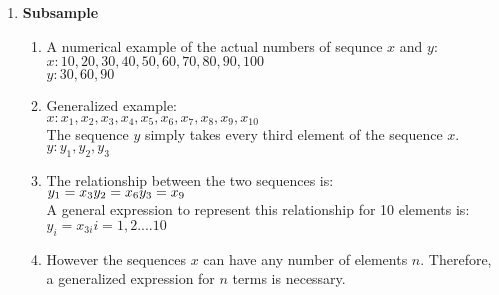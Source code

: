 \documentclass[letterpaper, 24pt, final, onecolumn, titlepage] {article}
\begin{document}
\begin {enumerate}
\begin{enumerate}
			\pagebreak
			\item However the sequences $x$ can have any number of elements $n$. Therefore, a generalized expression for $n$ terms is necessary.\\
				$x:x_0,x_1,x_2,x_3,...,x_{n-2},x_{n-1},x_n$\\
				$y:y_0,y_1,y_2,y_3,....,y_{n-2},y_{n-1},y_n$\\
				Each Element of $y$ can  be written i terms of $x$:\\
				$y_0=x_n\\
				 y_1=x_{n-1}\\
				 y_2=x_{n-2}\\
				 ...\\
			 	y_{n-2}=x_2\\
				 y_{n-1}=x_1\\
				 y_n=x_0$\\
 				 A general expression to represent this relationship for $n$ elements is:\\
				 $y_i=x_{n-i}$\hspace{10mm}$i=0,1,2,....n\\$
		\end{enumerate}
	\item \textbf{Subsample}
		\begin{enumerate}
			\item A numerical example of the actual numbers of sequnce $x$ and $y$:\\
				$x:10,20,30,40,50,60,70,80,90,100$\\
				$y:30,60,90$\\
			\item Generalized example:\\
				$x:x_1,x_2,x_3,x_4,x_5,x_6,x_7,x_8,x_9,x_{10}$\\
				The sequence $y$ simply takes every third element of the sequence $x$.\\
				$y:y_1,y_2,y_3$\\
			\item The relationship between the two sequences is:\\
				$y_1=x_3\\
				 y_2=x_6\\
				 y_3=x_9$\\
				 A general expression to represent this relationship for 10 elements is:\\
				 $y_i=x_{3i}$\hspace{10mm}$i=1,2....10$
			\pagebreak
			\item However the sequences $x$ can have any number of elements $n$. Therefore, a generalized expression for $n$ terms is necessary.\\

\end{enumerate}
\end{enumerate}
\end{document}
